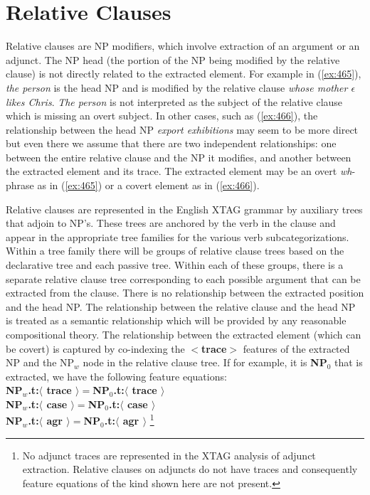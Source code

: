 \chapter{Relative Clauses} 
\label{rel_clauses} 
 
Relative clauses are NP modifiers, which involve extraction of 
an argument or an adjunct. The NP head (the 
portion of the NP being modified by the relative clause) is 
not directly related to the extracted element. 
For example in (\ref{ex:465}), {\it the person} is the head NP 
and is modified by the relative clause {\it whose mother $\epsilon$ likes Chris}. {\em The person} is not interpreted as the subject of the 
relative clause which is missing an overt subject. In other cases, such 
as (\ref{ex:466}), the relationship between the head NP {\em export exhibitions} 
may seem to be more direct but even there we assume that there are two 
independent relationships: one between the entire relative clause 
and the NP it modifies, and another between the extracted element 
and its trace. The extracted element may be an overt {\em wh}-phrase 
as in (\ref{ex:465}) or a covert element as in (\ref{ex:466}). 
 
\beginsentences
{}\label{ex:465} 
\label{ex:466} 
\endsentences

 
Relative clauses are represented in the English XTAG grammar by auxiliary trees 
that adjoin to NP's. These trees are anchored by the verb in the clause and 
appear in the appropriate tree families for the various verb 
subcategorizations. Within a tree family there will be groups of relative 
clause trees based on the declarative tree and each passive tree. Within each 
of these groups, there is a separate relative clause tree corresponding to each 
possible argument that can be extracted from the clause. There is 
no  relationship between the extracted position and the head NP. 
The relationship between the relative clause and the head NP is treated 
as a semantic relationship which will be provided by any reasonable 
compositional theory. The relationship between the extracted element 
(which can be covert) is captured by co-indexing the 
{\bf $<$trace$>$} features of the extracted NP and the NP$_{w}$ node in the 
relative clause tree. If for example, it is {\bf NP$_{0}$} that is extracted, 
we have the following feature equations:\\ 
{\bf NP$_{w}$.t:$\langle$ trace $\rangle =$NP$_{0}$.t:$\langle$ trace $\rangle$}\\ 
{\bf NP$_{w}$.t:$\langle$ case $\rangle =$NP$_{0}$.t:$\langle$ case $\rangle$}\\ 
{\bf NP$_{w}$.t:$\langle$ agr $\rangle =$NP$_{0}$.t:$\langle$ agr $\rangle$} 
\footnote{ No adjunct traces are represented in the XTAG analysis of adjunct extraction. Relative clauses on adjuncts do not have traces and consequently feature equations of the kind shown here are not present.} 
 
